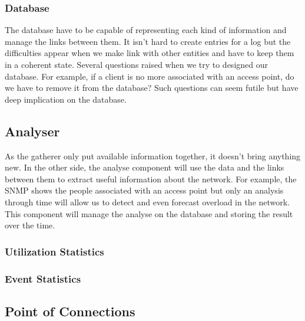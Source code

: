 \subsubsection{Database}
The database have to be capable of representing each kind of information and manage the links between them. It isn't hard to create entries for a log but the difficulties appear when we make link with other entities and have to keep them in a coherent state. Several questions raised when we try to designed our database. For example, if a client is no more associated with an access point, do we have to remove it from the database? Such questions can seem futile but have deep implication on the database.

\subsection{Analyser}
As the gatherer only put available information together, it doesn't bring anything new. In the other side, the analyse component will use the data and the links between them to extract useful information about the network. For example, the SNMP shows the people associated with an access point but only an analysis through time will allow us to detect and even forecast overload in the network. This component will manage the analyse on the database and storing the result over the time.

\subsubsection{Utilization Statistics}

\subsubsection{Event Statistics}

\subsection{Point of Connections}

